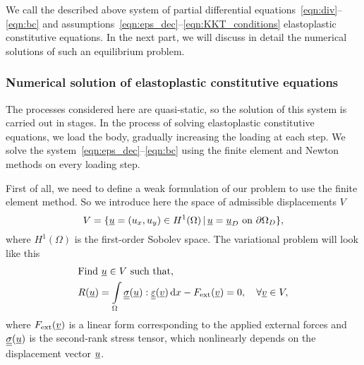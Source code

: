 \documentclass[12pt]{article}
\begin{document}
We call the described above system of partial differential equations~\eqref{eqn:div}--\eqref{eqn:bc} and assumptions~\eqref{eqn:eps_dec}--\eqref{eqn:KKT_conditions} elastoplastic constitutive equations. In the next part, we will discuss in detail the numerical solutions of such an equilibrium problem.

\subsubsection{Numerical solution of elastoplastic constitutive equations}
\label{sec:theory:classical_plasticity}

The processes considered here are quasi-static, so the solution of this system is carried out in stages. In the process of solving elastoplastic constitutive equations, we load the body, gradually increasing the loading at each step. We solve the system~\eqref{eqn:eps_dec}--\eqref{eqn:bc} using the finite element and Newton methods on every loading step. 

First of all, we need to define a weak formulation of our problem to use the finite element method. So we introduce here the space of admissible displacements $V$
\begin{equation}
    V = \{\underline{u} = (u_x, u_y) \in H^1(\Omega) \, | \, \underline{u} = \underline{u}_D \text{ on } \partial\Omega_D \},
\end{equation}
where $H^1(\Omega)$ is the first-order Sobolev space. The variational problem will look like this 
\begin{align}
    & \text{Find } \underline{u} \in V \text{ such that,} \label{eqn:var_from_1} \\ 
    & R(\underline{u}) = \int\limits_\Omega\underline{\underline{\sigma}}(\underline{u}) : \underline{\underline{\varepsilon}}(\underline{v}) \, \mathrm{d} x - F_\text{ext}(\underline{v}) = 0, \quad \forall \underline{v} \in V \label{eqn:var_from_2},
\end{align}
where $F_\text{ext}(\underline{v})$ is a linear form corresponding to the applied external forces and $\underline{\underline{\sigma}}(\underline{u})$ is the second-rank stress tensor, which nonlinearly depends on the displacement vector $\underline{u}$.
\end{document}
